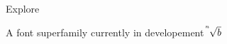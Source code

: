 \documentclass[11pt]{article}
\begin{document}
\begin{center}
	\fontsize{72}{80}\selectfont
	Explore
	
	\fontsize{16}{20}\selectfont
	\vspace{1em}A font superfamily currently in developement
	$\sqrt[\leftroot{10} \uproot{5} n]{b}$
\end{center}
\end{document}
